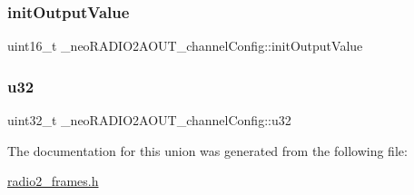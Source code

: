 \subsubsection{\texorpdfstring{init\+Output\+Value}{initOutputValue}}
{\footnotesize\ttfamily uint16\+\_\+t \+\_\+neo\+R\+A\+D\+I\+O2\+A\+O\+U\+T\+\_\+channel\+Config\+::init\+Output\+Value}

\mbox{\label{union__neo_r_a_d_i_o2_a_o_u_t__channel_config_ab022e4239a95afb2a99acc67911c4c96}} 
\subsubsection{\texorpdfstring{u32}{u32}}
{\footnotesize\ttfamily uint32\+\_\+t \+\_\+neo\+R\+A\+D\+I\+O2\+A\+O\+U\+T\+\_\+channel\+Config\+::u32}



The documentation for this union was generated from the following file\+:\begin{DoxyCompactItemize}
\item 
\mbox{\hyperlink{radio2__frames_8h}{radio2\+\_\+frames.\+h}}\end{DoxyCompactItemize}
